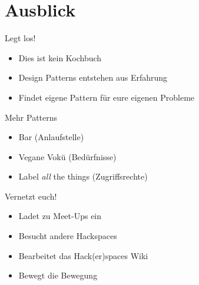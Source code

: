 \documentclass[aspectratio=43]{beamer}
\begin{document}
  \section{Ausblick}

  \begin{frame}{Legt los!}
    \begin{itemize}
      \item Dies ist kein Kochbuch
      \pause
      \item Design Patterns entstehen aus Erfahrung
      \pause
      \item Findet eigene Pattern für eure eigenen Probleme
    \end{itemize}
  \end{frame}

  \begin{frame}{Mehr Patterns}
    \begin{itemize}
      \item Bar (Anlaufstelle)
      \pause
      \item Vegane Vokü (Bedürfnisse)
      \pause
      \item Label \textsl{all} the things (Zugriffsrechte)
    \end{itemize}
  \end{frame}

  \begin{frame}{Vernetzt euch!}
    \begin{itemize}
      \item Ladet zu Meet-Ups ein
      \pause
      \item Besucht andere Hackspaces
      \pause
      \item Bearbeitet das Hack(er)spaces Wiki
      \pause
      \item Bewegt die Bewegung
    \end{itemize}
  \end{frame}
\end{document}
